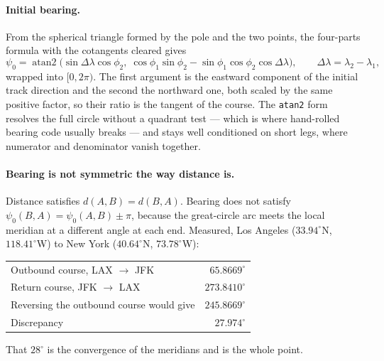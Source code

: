 \documentclass[11pt]{article}
\newcommand{\code}[1]{\texttt{#1}}
\begin{document}
\paragraph{Initial bearing.} From the spherical triangle formed by the pole and
the two points, the four-parts formula with the cotangents cleared gives
\begin{equation}
  \psi_0 = \operatorname{atan2}\bigl(
    \sin\Delta\lambda\cos\phi_2,\;
    \cos\phi_1\sin\phi_2 - \sin\phi_1\cos\phi_2\cos\Delta\lambda\bigr),
  \qquad \Delta\lambda = \lambda_2-\lambda_1,
  \label{eq:bearing}
\end{equation}
wrapped into $[0,2\pi)$. The first argument is the eastward component of the
initial track direction and the second the northward one, both scaled by the
same positive factor, so their ratio is the tangent of the course. The
\code{atan2} form resolves the full circle without a quadrant test --- which is
where hand-rolled bearing code usually breaks --- and stays well conditioned on
short legs, where numerator and denominator vanish together.

\paragraph{Bearing is not symmetric the way distance is.} Distance satisfies
$d(A,B) = d(B,A)$. Bearing does not satisfy
$\psi_0(B,A) = \psi_0(A,B) \pm \pi$, because the great-circle arc meets the
local meridian at a different angle at each end. Measured, Los Angeles
($33.94^{\circ}$N, $118.41^{\circ}$W) to New York ($40.64^{\circ}$N,
$73.78^{\circ}$W):
\begin{center}
\begin{tabular}{lr}
\toprule
Outbound course, LAX $\to$ JFK      & $65.8669^{\circ}$ \\
Return course, JFK $\to$ LAX        & $273.8410^{\circ}$ \\
Reversing the outbound course would give & $245.8669^{\circ}$ \\
Discrepancy                          & $27.974^{\circ}$ \\
\bottomrule
\end{tabular}
\end{center}
That $28^{\circ}$ is the convergence of the meridians and is the whole point.
\end{document}
